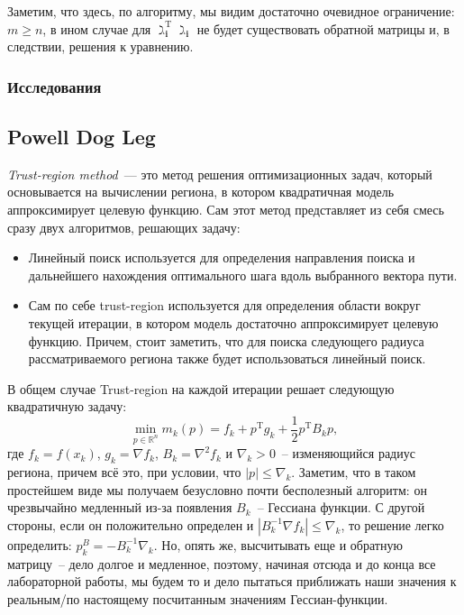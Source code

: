 \documentclass[12pt, a4paper, oneside, final]{article}
\begin{document}
	Заметим, что здесь, по алгоритму, мы видим достаточно очевидное ограничение: $m \geqslant n$, в ином случае для $\gimel_{\mathbf{i}}^{\mathrm{T}}\gimel_{\mathbf{i}}$ не будет существовать обратной матрицы и, в следствии, решения к уравнению.
	\subsubsection*{Исследования}
	\subsection*{Powell Dog Leg}
	\textit{Trust-region method}~--- это метод решения оптимизационных задач, который основывается на вычислении региона, в котором квадратичная модель аппроксимирует целевую функцию.
	Сам этот метод представляет из себя смесь сразу двух алгоритмов, решающих задачу:
	\begin{itemize}
		\item Линейный поиск используется для определения направления поиска и дальнейшего нахождения оптимального шага вдоль выбранного вектора пути.
		\item Сам по себе trust-region используется для определения области вокруг текущей итерации, в котором модель достаточно аппроксимирует целевую функцию. Причем, стоит заметить, что для поиска следующего радиуса рассматриваемого региона также будет использоваться линейный поиск.
	\end{itemize}
	В общем случае Trust-region на каждой итерации решает следующую квадратичную задачу:
	\[
		\min_{p \in \mathbb{R}^{n}}{m_{k}(p)} = f_{k} + p^{\mathrm{T}}g_{k} + \dfrac{1}{2}p^{\mathrm{T}}B_{k}p,
	\] где $f_{k} = f(x_{k})$, $g_{k} = \nabla{f_{k}}$, $B_{k} = \nabla^{2}{f_{k}}$ и $\nabla_{k} > 0$~-- изменяющийся радиус региона, причем всё это, при условии, что $|p| \leqslant \nabla_{k}$.
	Заметим, что в таком простейшем виде мы получаем безусловно почти бесполезный алгоритм: он чрезвычайно медленный из-за появления $B_{k}$~-- Гессиана функции.
	С другой стороны, если он положительно определен и $|B_{k}^{-1}\nabla{f_{k}}| \leqslant \nabla_{k}$, то решение легко определить: $p_{k}^{B} = -B_{k}^{-1}\nabla_{k}$.
	Но, опять же, высчитывать еще и обратную матрицу~-- дело долгое и медленное, поэтому, начиная отсюда и до конца все лабораторной работы, мы будем то и дело пытаться приближать наши значения к реальным/по настоящему посчитанным значениям Гессиан-функции.
\end{document}
